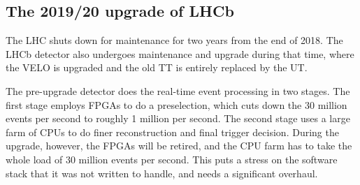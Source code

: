 \documentclass[12pt]{article}
\begin{document}
\subsection{The 2019/20 upgrade of LHCb}\label{sec_lhcb_upgrade}

The LHC shuts down for maintenance for two years from the end of 2018. The LHCb detector also undergoes maintenance and upgrade during that time, where the VELO is upgraded and the old TT is entirely replaced by the UT.

The pre-upgrade detector does the real-time event processing in two stages. The first stage employs FPGAs to do a preselection, which cuts down the 30 million events per second to roughly 1 million per second. The second stage uses a large farm of CPUs to do finer reconstruction and final trigger decision. During the upgrade, however, the FPGAs will be retired, and the CPU farm has to take the whole load of 30 million events per second. This puts a stress on the software stack that it was not written to handle, and needs a significant overhaul.
\end{document}
